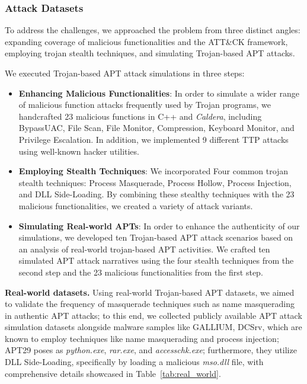 \subsubsection{Attack Datasets}

To address the challenges, we approached the problem from three distinct angles: expanding coverage of malicious functionalities and the ATT\&CK framework, employing trojan stealth techniques, and simulating Trojan-based APT attacks.

We executed Trojan-based APT attack simulations in three steps:
\begin{itemize}
    \item \textbf{Enhancing Malicious Functionalities}: In order to simulate a wider range of malicious function attacks frequently used by Trojan programs, we handcrafted 23 malicious functions in C++ and \textit{Caldera}\cite{caldera}, including BypassUAC, File Scan, File Monitor, Compression, Keyboard Monitor, and Privilege Escalation. In addition, we implemented 9 different TTP attacks using well-known hacker utilities. 
    \item \textbf{Employing Stealth Techniques}: We incorporated Four common trojan stealth techniques: Process Masquerade, Process Hollow, Process Injection, and DLL Side-Loading. By combining these stealthy techniques with the 23 malicious functionalities, we created a variety of attack variants. 
    \item \textbf{Simulating Real-world APTs}: In order to enhance the authenticity of our simulations, we developed ten Trojan-based APT attack scenarios based on an analysis of real-world trojan-based APT activities. We crafted ten simulated APT attack narratives using the four stealth techniques from the second step and the 23 malicious functionalities from the first step.
\end{itemize}


\noindent
{\bf Real-world datasets.} Using real-world Trojan-based APT datasets, we aimed to validate the frequency of masquerade techniques such as name masquerading in authentic APT attacks; to this end, we collected publicly available APT attack simulation datasets alongside malware samples like GALLIUM\cite{cybereason2023}, DCSrv\cite{checkpoint2021},  which are known to employ techniques like name masquerading and process injection;  APT29 poses as \textit{python.exe}, \textit{rar.exe}, and \textit{accesschk.exe}; furthermore, they utilize DLL Side-Loading, specifically by loading a malicious \textit{mso.dll} file, with comprehensive details showcased in Table~\ref{tab:real_world}.


